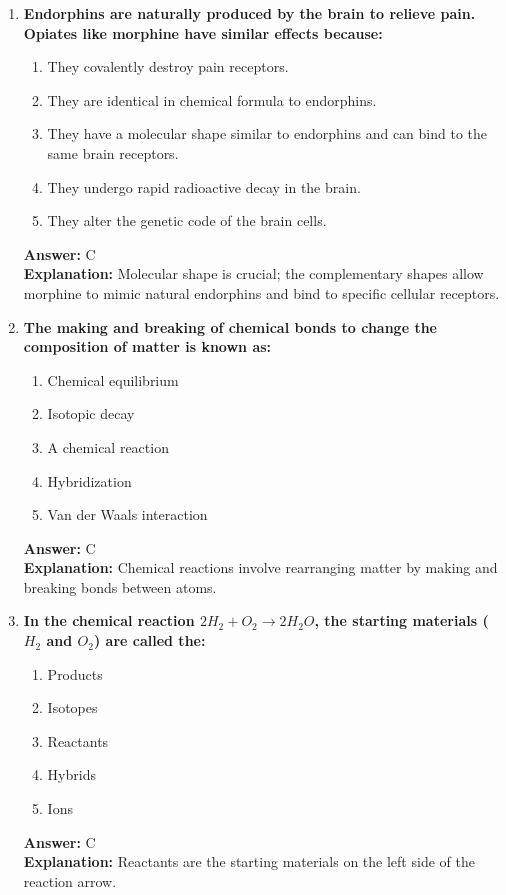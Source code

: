 \documentclass[11pt, a4paper]{article}
\begin{document}
\begin{enumerate}
\item \textbf{Endorphins are naturally produced by the brain to relieve pain. Opiates like morphine have similar effects because:}
\begin{enumerate}[label=\Alph*.]
    \item They covalently destroy pain receptors.
    \item They are identical in chemical formula to endorphins.
    \item They have a molecular shape similar to endorphins and can bind to the same brain receptors.
    \item They undergo rapid radioactive decay in the brain.
    \item They alter the genetic code of the brain cells.
\end{enumerate}
\textbf{Answer:} C \\
\textbf{Explanation:} Molecular shape is crucial; the complementary shapes allow morphine to mimic natural endorphins and bind to specific cellular receptors.


\item \textbf{The making and breaking of chemical bonds to change the composition of matter is known as:}
\begin{enumerate}[label=\Alph*.]
    \item Chemical equilibrium
    \item Isotopic decay
    \item A chemical reaction
    \item Hybridization
    \item Van der Waals interaction
\end{enumerate}
\textbf{Answer:} C \\
\textbf{Explanation:} Chemical reactions involve rearranging matter by making and breaking bonds between atoms.

\item \textbf{In the chemical reaction $2H_2 + O_2 \rightarrow 2H_2O$, the starting materials ($H_2$ and $O_2$) are called the:}
\begin{enumerate}[label=\Alph*.]
    \item Products
    \item Isotopes
    \item Reactants
    \item Hybrids
    \item Ions
\end{enumerate}
\textbf{Answer:} C \\
\textbf{Explanation:} Reactants are the starting materials on the left side of the reaction arrow.


\end{enumerate}
\end{document}
